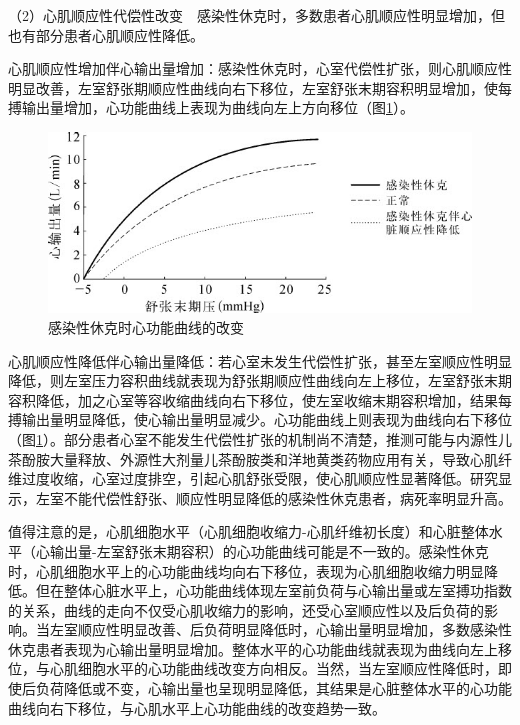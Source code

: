 （2）心肌顺应性代偿性改变　感染性休克时，多数患者心肌顺应性明显增加，但也有部分患者心肌顺应性降低。

心肌顺应性增加伴心输出量增加：感染性休克时，心室代偿性扩张，则心肌顺应性明显改善，左室舒张期顺应性曲线向右下移位，左室舒张末期容积明显增加，使每搏输出量增加，心功能曲线上表现为曲线向左上方向移位（图\ref{fig2-2}）。

\begin{figure}[!htbp]
 \centering
 \includegraphics{./images/Image00011.jpg}
 \captionsetup{justification=centering}
 \caption{感染性休克时心功能曲线的改变}
 \label{fig2-2}
  \end{figure} 

心肌顺应性降低伴心输出量降低：若心室未发生代偿性扩张，甚至左室顺应性明显降低，则左室压力容积曲线就表现为舒张期顺应性曲线向左上移位，左室舒张末期容积降低，加之心室等容收缩曲线向右下移位，使左室收缩末期容积增加，结果每搏输出量明显降低，使心输出量明显减少。心功能曲线上则表现为曲线向右下移位（图\ref{fig2-2}）。部分患者心室不能发生代偿性扩张的机制尚不清楚，推测可能与内源性儿茶酚胺大量释放、外源性大剂量儿茶酚胺类和洋地黄类药物应用有关，导致心肌纤维过度收缩，心室过度排空，引起心肌舒张受限，使心肌顺应性显著降低。研究显示，左室不能代偿性舒张、顺应性明显降低的感染性休克患者，病死率明显升高。

值得注意的是，心肌细胞水平（心肌细胞收缩力-心肌纤维初长度）和心脏整体水平（心输出量-左室舒张末期容积）的心功能曲线可能是不一致的。感染性休克时，心肌细胞水平上的心功能曲线均向右下移位，表现为心肌细胞收缩力明显降低。但在整体心脏水平上，心功能曲线体现左室前负荷与心输出量或左室搏功指数的关系，曲线的走向不仅受心肌收缩力的影响，还受心室顺应性以及后负荷的影响。当左室顺应性明显改善、后负荷明显降低时，心输出量明显增加，多数感染性休克患者表现为心输出量明显增加。整体水平的心功能曲线就表现为曲线向左上移位，与心肌细胞水平的心功能曲线改变方向相反。当然，当左室顺应性降低时，即使后负荷降低或不变，心输出量也呈现明显降低，其结果是心脏整体水平的心功能曲线向右下移位，与心肌水平上心功能曲线的改变趋势一致。

